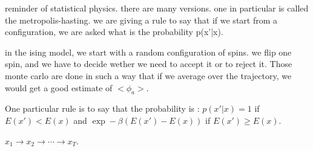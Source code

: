 \documentclass[a4paper]{tufte-book}
\begin{document}
reminder of statistical physics.
there are many versions. one in particular is called the metropolis-hasting.
we are giving a rule to say that if we start from a configuration, we are asked
what is the probability p(x'|x).

in the ising model, we start with a random configuration of spins. we flip one
spin, and we have to decide wether we need to accept it or to reject it.
Those monte carlo are done in such a way that if we average over the trajectory,
we would get a good estimate of $<\phi_a>$.

One particular rule is to say that the probability is :
$p(x'|x) = 1$ if $E(x') < E(x)$ and $\exp -\beta (E(x')-E(x))$ if $E(x')\geq E(x)$.

$x_1 \rightarrow x_2 \rightarrow \cdots \rightarrow x_T$.
\end{document}
